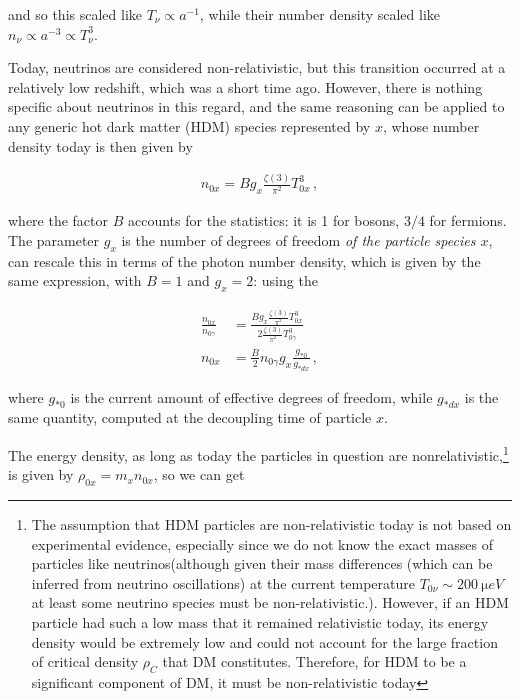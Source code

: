 and so this scaled like \(T_\nu \propto a^{-1}\), while their number density scaled like \(n_\nu \propto a^{-3} \propto T_\nu^{3}\).

\hspace{0.5cm}Today, neutrinos are considered non-relativistic, but this transition occurred at a relatively low redshift, which was a short time ago. However, there is nothing specific about neutrinos in this regard, and the same reasoning can be applied to any generic hot dark matter (HDM) species represented by \(x\), whose number density today is then given by

\begin{align}
  n_{0x} = B g_{x} \frac{\zeta (3)}{\pi^2} T_{0x}^3
\,,
\end{align}

where the factor \(B\) accounts for the statistics: it is 1 for bosons, \(3/4\) for fermions. The parameter \(g_x\) is the number of degrees of freedom \emph{of the particle species \(x\)}, 
 can rescale this in terms of the photon number density, which is given by the same expression, with \(B = 1\) and \(g_x = 2\): using the 

\begin{align}
\frac{n_{0x}}{n_{0\gamma }} &= \frac{B g_x \frac{\zeta (3)}{\pi^2} T^3_{0x}}{2 \frac{\zeta (3)}{\pi^2} T^3_{0 \gamma }} \\
n_{0x} &= \frac{B}{2} n_{0 \gamma } g_x \frac{g_{*0}}{g_{*dx}}
\,,
\end{align}

where \(g_{*0}\) is the current amount of effective degrees of freedom, while \(g_{*dx}\) is the same quantity, computed at the decoupling time of particle \(x\). 



The energy density, as long as today the particles in question are nonrelativistic,\footnote{
The assumption that HDM particles are non-relativistic today is not based on experimental evidence, especially since we do not know the exact masses of particles like neutrinos(although given their mass differences (which can be inferred from neutrino oscillations) at the current temperature \(T_{0 \nu } \sim \SI{200}{\micro eV}\) at least some neutrino species must be non-relativistic.). However, if an HDM particle had such a low mass that it remained relativistic today, its energy density would be extremely low and could not account for the large fraction of critical density \(\rho _C\)  that DM constitutes. Therefore, for HDM to be a significant component of DM, it must be non-relativistic today} is given by \(\rho_{0x} = m_x n_{0x}\), so we can get

